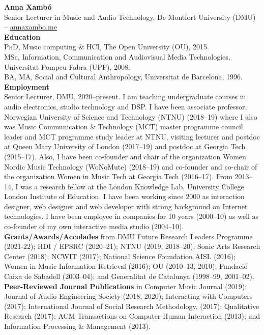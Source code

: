 \documentclass[10pt, a4paper]{article}
\begin{document}

{\textbf{Anna Xambó}}\\ 
Senior Lecturer in Music and Audio Technology, De Montfort University (DMU) -- \href{http://annaxambo.me/}{annaxambo.me}\\

{\textbf{Education}}\\
\textsc{PhD}, Music computing \& HCI, The Open University (OU), 2015.\\
MSc, Information, Communication and Audiovisual Media Technologies, Universitat Pompeu Fabra (UPF), 2008.\\
BA, MA, Social and Cultural Anthropology, Universitat de Barcelona, 1996.\\

{\textbf{Employment}}\\
Senior Lecturer, DMU, 2020--present. I am teaching undergraduate courses in audio electronics, studio technology and DSP. 
I have been associate professor, Norwegian University of Science and Technology (NTNU) (2018--19) where I also was Music Communication \& Technology (MCT) master programme council leader and MCT programme study leader at NTNU, visiting lecturer and postdoc at Queen Mary University of London (2017--19) and postdoc at Georgia Tech (2015--17). Also, I have been co-founder and chair of the organization Women Nordic Music Technology (WoNoMute) (2018--19) and co-founder and co-chair of the organization Women in Music Tech at Georgia Tech (2016--17). From 2013--14, I was a research fellow at the London Knowledge Lab, University College London Institute of Education.
I have been working since 2000 as interaction designer, web designer and web developer with strong background on Internet technologies. I have been employee in companies for 10 years (2000--10) as well as co-founder of my own interactive media studio (2004--10).\\

{\textbf{Grants/Awards/Accolades}} from DMU Future Research Leaders Programme (2021-22); HDI / EPSRC (2020--21); NTNU (2019, 2018--20); Sonic Arts Research Center (2018); NCWIT (2017); National Science Foundation AISL (2016); Women in Music Information Retrieval (2016); OU (2010--13, 2010); Fundació Caixa de Sabadell (2003--04); and Generalitat de Catalunya (1998--99, 2001--02).\\

{\textbf{Peer-Reviewed Journal Publications}} in Computer Music Journal (2019); Journal of Audio Engineering Society (2018, 2020); Interacting with Computers (2017); International Journal of Social Research Methodology, (2017); Qualitative Research (2017); ACM Transactions on Computer-Human Interaction (2013); and Information Processing \& Management (2013).\\
\end{document}
